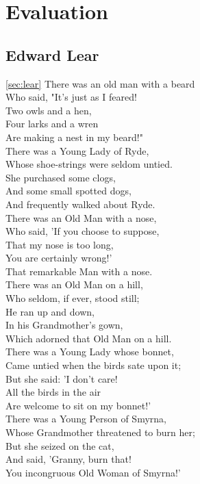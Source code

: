 \section{Evaluation}

\subsection{Edward Lear}
\ref{sec:lear}
There was an old man with a beard\\
Who said, "It's just as I feared!\\
Two owls and a hen,\\
Four larks and a wren\\
Are making a nest in my beard!"\\

There was a Young Lady of Ryde,\\
Whose shoe-strings were seldom untied.\\
She purchased some clogs,\\
And some small spotted dogs,\\
And frequently walked about Ryde.\\


There was an Old Man with a nose,\\
Who said, 'If you choose to suppose,\\
That my nose is too long,\\
You are certainly wrong!'\\
That remarkable Man with a nose.\\

There was an Old Man on a hill,\\
Who seldom, if ever, stood still;\\
He ran up and down,\\
In his Grandmother's gown,\\
Which adorned that Old Man on a hill.\\

There was a Young Lady whose bonnet,\\
Came untied when the birds sate upon it;\\
But she said: 'I don't care!\\
All the birds in the air\\
Are welcome to sit on my bonnet!'\\


There was a Young Person of Smyrna,\\
Whose Grandmother threatened to burn her;\\
But she seized on the cat,\\
And said, 'Granny, burn that!\\
You incongruous Old Woman of Smyrna!'\\


